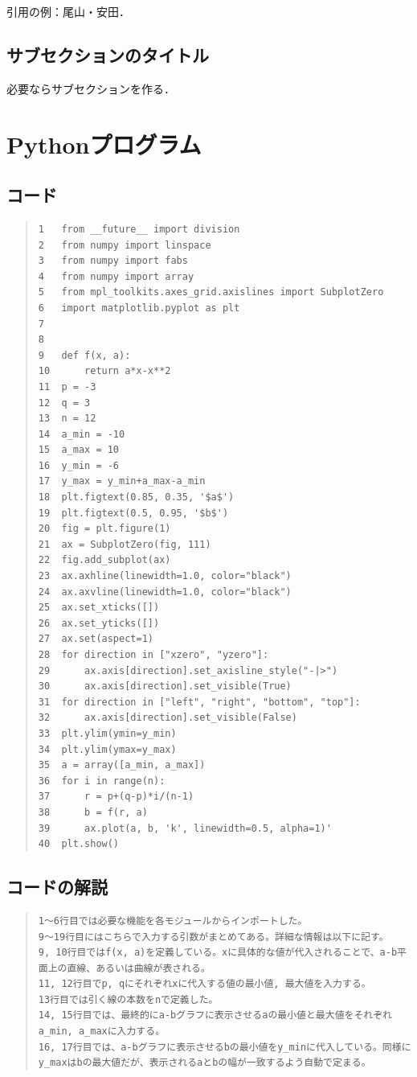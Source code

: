 \documentclass[11pt,a4j,fleqn]{jarticle}
\begin{document}
引用の例：尾山・安田\cite{OyamaYasuda11}．


\subsection{サブセクションのタイトル}

必要ならサブセクションを作る．


\newpage
\section{Pythonプログラム}
\subsection{コード}
\begin{quote}
\begin{verbatim}
1  	from __future__ import division
2  	from numpy import linspace
3  	from numpy import fabs
4  	from numpy import array
5  	from mpl_toolkits.axes_grid.axislines import SubplotZero
6  	import matplotlib.pyplot as plt
7  	
8  	
9  	def f(x, a):
10 	    return a*x-x**2
11 	p = -3
12 	q = 3
13 	n = 12
14 	a_min = -10
15 	a_max = 10
16 	y_min = -6
17 	y_max = y_min+a_max-a_min
18 	plt.figtext(0.85, 0.35, '$a$')
19 	plt.figtext(0.5, 0.95, '$b$')
20 	fig = plt.figure(1)
21 	ax = SubplotZero(fig, 111)
22 	fig.add_subplot(ax)
23 	ax.axhline(linewidth=1.0, color="black")
24 	ax.axvline(linewidth=1.0, color="black")
25 	ax.set_xticks([])
26 	ax.set_yticks([])
27 	ax.set(aspect=1)
28 	for direction in ["xzero", "yzero"]:
29 	    ax.axis[direction].set_axisline_style("-|>")
30 	    ax.axis[direction].set_visible(True)
31 	for direction in ["left", "right", "bottom", "top"]:
32 	    ax.axis[direction].set_visible(False)
33 	plt.ylim(ymin=y_min)
34 	plt.ylim(ymax=y_max)
35 	a = array([a_min, a_max])
36 	for i in range(n):
37 	    r = p+(q-p)*i/(n-1)
38 	    b = f(r, a)
39 	    ax.plot(a, b, 'k', linewidth=0.5, alpha=1)'
40 	plt.show()
\end{verbatim}
\end{quote}

\subsection{コードの解説}
\begin{quote}
\begin{verbatim}
1～6行目では必要な機能を各モジュールからインポートした。
9～19行目にはこちらで入力する引数がまとめてある。詳細な情報は以下に記す。
9, 10行目ではf(x, a)を定義している。xに具体的な値が代入されることで、a-b平面上の直線、あるいは曲線が表される。
11, 12行目でp, qにそれぞれxに代入する値の最小値, 最大値を入力する。
13行目では引く線の本数をnで定義した。
14, 15行目では、最終的にa-bグラフに表示させるaの最小値と最大値をそれぞれa_min, a_maxに入力する。
16, 17行目では、a-bグラフに表示させるbの最小値をy_minに代入している。同様にy_maxはbの最大値だが、表示されるaとbの幅が一致するよう自動で定まる。
\end{verbatim}
\end{quote}
\end{document}
